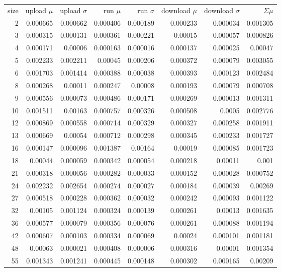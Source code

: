\begin{longtable}{r r r r r r r r}
size & upload $\mu$  & upload $\sigma$ & run $\mu$ & run $\sigma$ & download $\mu$ & download $\sigma$ & $\Sigma \mu$ \\
2 & 0.000665 & 0.000662 & 0.000406 & 0.000189 & 0.000233 & 0.000034 & 0.001305 \\
3 & 0.000315 & 0.000131 & 0.000361 & 0.000221 & 0.00015 & 0.000057 & 0.000826 \\
4 & 0.000171 & 0.00006 & 0.000163 & 0.000016 & 0.000137 & 0.000025 & 0.00047 \\
5 & 0.002233 & 0.002211 & 0.00045 & 0.000206 & 0.000372 & 0.000079 & 0.003055 \\
6 & 0.001703 & 0.001414 & 0.000388 & 0.000038 & 0.000393 & 0.000123 & 0.002484 \\
8 & 0.000268 & 0.00011 & 0.000247 & 0.00008 & 0.000193 & 0.000079 & 0.000708 \\
9 & 0.000556 & 0.000073 & 0.000486 & 0.000171 & 0.000269 & 0.000013 & 0.001311 \\
10 & 0.001511 & 0.00163 & 0.000757 & 0.000326 & 0.000508 & 0.0005 & 0.002776 \\
12 & 0.000869 & 0.000558 & 0.000714 & 0.000329 & 0.000327 & 0.000258 & 0.001911 \\
13 & 0.000669 & 0.00054 & 0.000712 & 0.000298 & 0.000345 & 0.000233 & 0.001727 \\
16 & 0.000147 & 0.000096 & 0.001387 & 0.00164 & 0.00019 & 0.000085 & 0.001723 \\
18 & 0.00044 & 0.000059 & 0.000342 & 0.000054 & 0.000218 & 0.00011 & 0.001 \\
21 & 0.000318 & 0.000056 & 0.000282 & 0.000033 & 0.000152 & 0.000028 & 0.000752 \\
24 & 0.002232 & 0.002654 & 0.000274 & 0.000027 & 0.000184 & 0.000039 & 0.00269 \\
27 & 0.000518 & 0.000228 & 0.000362 & 0.000032 & 0.000242 & 0.000093 & 0.001122 \\
32 & 0.00105 & 0.001124 & 0.000324 & 0.000139 & 0.000261 & 0.00013 & 0.001635 \\
36 & 0.000577 & 0.000079 & 0.000356 & 0.000076 & 0.000261 & 0.000088 & 0.001194 \\
42 & 0.000607 & 0.000103 & 0.000334 & 0.000069 & 0.00024 & 0.000101 & 0.001181 \\
48 & 0.00063 & 0.000021 & 0.000408 & 0.000006 & 0.000316 & 0.00001 & 0.001354 \\
55 & 0.001343 & 0.001241 & 0.000445 & 0.000148 & 0.000302 & 0.000165 & 0.00209 \\

\end{longtable}
